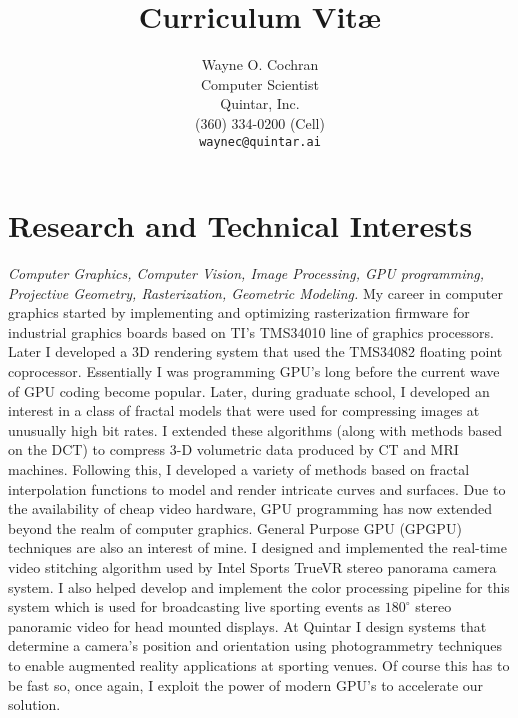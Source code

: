 \documentclass[10pt]{article}
\title{Curriculum Vit\ae}
\author{Wayne O. Cochran\\
        Computer Scientist\\
        Quintar, Inc.\\
       (360) 334-0200 (Cell) \\
       {\tt waynec@quintar.ai}}
\begin{document}
\maketitle




\section*{Research and Technical Interests}

{\em Computer Graphics, Computer Vision, Image Processing, 
GPU programming, Projective Geometry, Rasterization, Geometric Modeling.}
My career in computer graphics started by 
implementing and optimizing rasterization firmware
for industrial graphics boards based on
TI's TMS34010 line of graphics processors.
Later I developed a 3D rendering system
that used the TMS34082 floating  point coprocessor.
Essentially I was programming GPU's long before
the current wave of GPU coding become popular.
Later, during graduate school, I developed an interest
in a class of fractal models that were used for compressing
images at unusually high bit rates. I extended these
algorithms (along with methods based on the DCT)
to compress 3-D volumetric data produced by CT
and MRI machines. Following this, I developed a variety of methods
based on fractal interpolation functions to model
and render intricate curves and surfaces.
Due to the availability of cheap video hardware,
GPU programming
has now extended beyond the realm of computer graphics.
General Purpose GPU (GPGPU) techniques are also
an interest of mine.
I designed and implemented the real-time video stitching algorithm
used by Intel Sports TrueVR 
stereo panorama camera system. I also helped develop and implement
the color processing pipeline for this system
which is used for broadcasting live sporting events as $180^\circ$ stereo
panoramic video for head mounted displays.
At Quintar I design systems that determine a camera's position
and orientation using photogrammetry techniques to enable
augmented reality applications at sporting venues.
Of course this has to be fast so, once again, I exploit
the power of modern GPU's to accelerate our solution.
\end{document}
